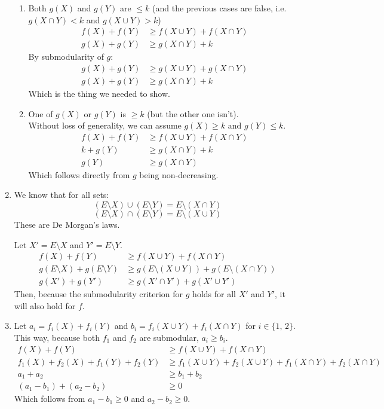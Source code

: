 \documentclass{article}
\begin{document}
\begin{enumerate}[label=(\roman*)]
\begin{enumerate}[label=Case \arabic*:]
      \item Both $g(X)$ and $g(Y)$ are $\leq k$ (and the previous cases are false, i.e. $g(X \cap Y) < k$ and $g(X \cup Y) > k$)
      \begin{align*}
        f(X) + f(Y) &\geq f(X \cup Y) + f(X \cap Y) \\
        g(X) + g(Y) &\geq g(X \cap Y) + k
      \end{align*}
      By submodularity of $g$:
      \begin{align*}
        g(X) + g(Y) &\geq g(X \cup Y) + g(X \cap Y) \\
        g(X) + g(Y) &\geq g(X \cap Y) + k
      \end{align*}
      Which is the thing we needed to show.

      \item One of $g(X)$ or $g(Y)$ is $\geq k$ (but the other one isn't). \\
      Without loss of generality, we can assume $g(X) \geq k$ and $g(Y) \leq k$.
      \begin{align*}
        f(X) + f(Y) &\geq f(X \cup Y) + f(X \cap Y) \\
        k + g(Y) &\geq g(X \cap Y) + k \\
        g(Y) &\geq g(X \cap Y)
      \end{align*}
      Which follows directly from $g$ being non-decreasing.
    \end{enumerate}

    \item We know that for all sets:
    \[ (E \setminus X) \cup (E \setminus Y) = E \setminus (X \cap Y) \]
    \[ (E \setminus X) \cap (E \setminus Y) = E \setminus (X \cup Y) \]
    These are De Morgan's laws.

    Let $X' = E \setminus X$ and $Y' = E \setminus Y$.
    \begin{align*}
      f(X) + f(Y) &\geq f(X \cup Y) + f(X \cap Y) \\
      g(E \setminus X) + g(E \setminus Y) &\geq g(E \setminus (X \cup Y)) + g(E \setminus (X \cap Y)) \\
      g(X') + g(Y') &\geq  g(X' \cap Y') + g(X' \cup Y')
    \end{align*}
    Then, because the submodularity criterion for $g$ holds for all $X'$ and $Y'$,
    it will also hold for $f$.

    \item Let $a_i = f_i(X) + f_i(Y)$ and $b_i = f_i(X \cup Y) + f_i(X \cap Y)$ for $i \in \{1,\, 2\}$.
    This way, because both $f_1$ and $f_2$ are submodular, $a_i \geq b_i$.
    \begin{align*}
      f(X) + f(Y) &\geq f(X \cup Y) + f(X \cap Y) \\
      f_1(X) + f_2(X) + f_1(Y) + f_2(Y) &\geq f_1(X \cup Y) + f_2(X \cup Y) + f_1(X \cap Y) + f_2(X \cap Y) \\
      a_1 + a_2 &\geq b_1 + b_2 \\
      (a_1 - b_1) + (a_2 - b_2) &\geq 0
    \end{align*}
    Which follows from $a_1 - b_1 \geq 0$ and $a_2 - b_2 \geq 0$.
  \end{enumerate}
\end{document}
